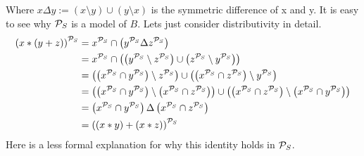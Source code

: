 	Where $x\Delta y:=(x\setminus y)\cup(y\setminus x)$ is the symmetric difference of x and y. It is easy to see why ${\mathcal{P}_S}$ is a model of $B$. Lets just consider distributivity in detail.
	\begin{align*}
		\left( x*\left( y+z\right) \right) ^{\mathcal{P}_S} & =x^{\mathcal{P}_S}\cap\left( y^{\mathcal{P}_S}\Delta z^{\mathcal{P}_S}\right)                                                                                                                                                \\
		                                          & =x^{\mathcal{P}_S}\cap\left( \left( y^{\mathcal{P}_S}\setminus z^{\mathcal{P}_S}\right) \cup\left( z^{\mathcal{P}_S}\setminus y^{\mathcal{P}_S}\right) \right)                                                                                   \\
		                                          & =\left( \left( x^{\mathcal{P}_S}\cap y^{\mathcal{P}_S}\right) \setminus z^{\mathcal{P}_S}\right) \cup\left( \left( x^{\mathcal{P}_S}\cap z^{\mathcal{P}_S}\right) \setminus y^{\mathcal{P}_S}\right)                                                       \\
		                                          & =\left( \left( x^{\mathcal{P}_S}\cap y^{\mathcal{P}_S}\right) \setminus \left( x^{\mathcal{P}_S}\cap z^{\mathcal{P}_S}\right) \right) \cup\left( \left( x^{\mathcal{P}_S}\cap z^{\mathcal{P}_S}\right) \setminus \left( x^{\mathcal{P}_S}\cap y^{\mathcal{P}_S}\right) \right) \\
		                                          & =\left( x^{\mathcal{P}_S}\cap y^{\mathcal{P}_S}\right) \Delta \left( x^{\mathcal{P}_S}\cap z^{\mathcal{P}_S}\right)                                                                                                                    \\
		                                          & =\left( \left( x*y\right) +\left( x*z\right)\right)^{\mathcal{P}_S}                                                                                                                                      
	\end{align*}
	Here is a less formal explanation for why this identity holds in ${\mathcal{P}_S}$.\\
	\def\f{1.3}
	\def\CircleX{(\f*0.5,\f*0.866) circle (\f*0.8)}
	\def\CircleY{(\f*0,0) circle (\f*0.8)}
	\def\CircleZ{(\f*1,0) circle (\f*0.8)}
